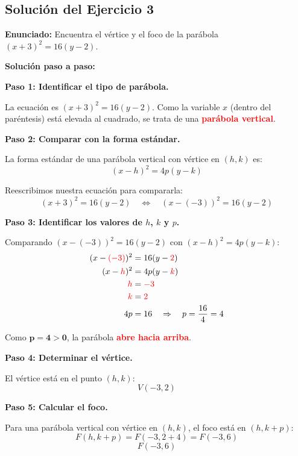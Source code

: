 \documentclass[12pt,a4paper]{article}
\begin{document}
	\newpage

	\subsection*{Solución del Ejercicio 3}

	\textbf{Enunciado:} Encuentra el vértice y el foco de la parábola \((x+3)^2=16(y-2)\).

	\bigskip

	\textbf{Solución paso a paso:}

	\bigskip

	\textbf{Paso 1: Identificar el tipo de parábola.}

	La ecuación es \((x+3)^2=16(y-2)\). Como la variable \(x\) (dentro del paréntesis) está elevada al cuadrado, se trata de una \textcolor{red}{\textbf{parábola vertical}}.

	\bigskip

	\textbf{Paso 2: Comparar con la forma estándar.}

	La forma estándar de una parábola vertical con vértice en \((h,k)\) es:
	\[
	(x-h)^2=4p(y-k)
	\]

	Reescribimos nuestra ecuación para compararla:
	\[
	(x+3)^2=16(y-2) \quad\Leftrightarrow\quad (x-(-3))^2=16(y-2)
	\]

	\textbf{Paso 3: Identificar los valores de \(h\), \(k\) y \(p\).}

	Comparando \((x-(-3))^2=16(y-2)\) con \((x-h)^2=4p(y-k)\):
	\[
	\begin{aligned}
		(x-{\color{red}{(-3)}})^2&=16(y-{\color{red}{2}}) \\
		 (x-{\color{red}{h}})^2&=4p(y-{\color{red}{k}}) \\
		{\color{red}{h}} &= {\color{red}{-3}} \\
		{\color{red}{k}} &= {\color{red}{2}} \\
		4p &= 16 \quad\Rightarrow\quad p=\frac{16}{4}=4
	\end{aligned}
	\]

	Como \(\mathbf{p=4>0}\), la parábola \textcolor{red}{\textbf{abre hacia arriba}}.

	\bigskip

	\textbf{Paso 4: Determinar el vértice.}

	El vértice está en el punto \((h,k)\):
	\[
	\boxed{V(-3,2)}
	\]

	\textbf{Paso 5: Calcular el foco.}

	Para una parábola vertical con vértice en \((h,k)\), el foco está en \((h,k+p)\):
	\[
	F(h,k+p)=F(-3,2+4)=F(-3,6)
	\]
	\[
	\boxed{F(-3,6)}
	\]
\end{document}
